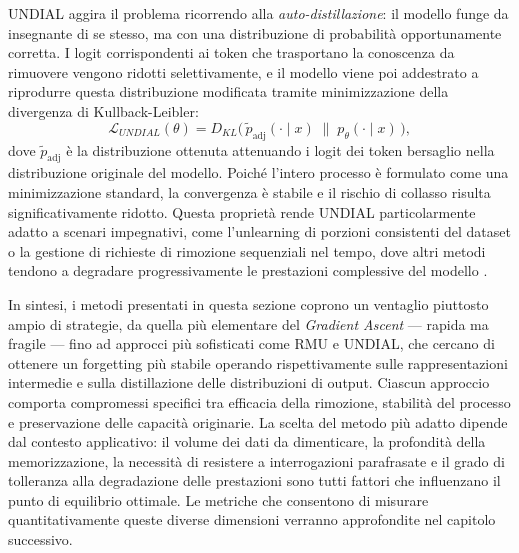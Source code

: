 UNDIAL aggira il problema ricorrendo alla \emph{auto-distillazione}: il modello funge da insegnante di se stesso, ma con una distribuzione di probabilità opportunamente corretta. I logit corrispondenti ai token che trasportano la conoscenza da rimuovere vengono ridotti selettivamente, e il modello viene poi addestrato a riprodurre questa distribuzione modificata tramite minimizzazione della divergenza di Kullback-Leibler:
\begin{equation}
    \mathcal{L}_{UNDIAL}(\theta) = D_{KL}\!\bigl(\,\tilde{p}_{\mathrm{adj}}(\cdot \mid x) \;\|\; p_\theta(\cdot \mid x)\,\bigr),
    \label{eq:undial}
\end{equation}
dove $\tilde{p}_{\mathrm{adj}}$ è la distribuzione ottenuta attenuando i logit dei token bersaglio nella distribuzione originale del modello. Poiché l'intero processo è formulato come una minimizzazione standard, la convergenza è stabile e il rischio di collasso risulta significativamente ridotto. Questa proprietà rende UNDIAL particolarmente adatto a scenari impegnativi, come l'unlearning di porzioni consistenti del dataset o la gestione di richieste di rimozione sequenziali nel tempo, dove altri metodi tendono a degradare progressivamente le prestazioni complessive del modello \cite{dong_undial_2024}.

\medskip

In sintesi, i metodi presentati in questa sezione coprono un ventaglio piuttosto ampio di strategie, da quella più elementare del \emph{Gradient Ascent} — rapida ma fragile — fino ad approcci più sofisticati come RMU e UNDIAL, che cercano di ottenere un forgetting più stabile operando rispettivamente sulle rappresentazioni intermedie e sulla distillazione delle distribuzioni di output. Ciascun approccio comporta compromessi specifici tra efficacia della rimozione, stabilità del processo e preservazione delle capacità originarie. La scelta del metodo più adatto dipende dal contesto applicativo: il volume dei dati da dimenticare, la profondità della memorizzazione, la necessità di resistere a interrogazioni parafrasate e il grado di tolleranza alla degradazione delle prestazioni sono tutti fattori che influenzano il punto di equilibrio ottimale. Le metriche che consentono di misurare quantitativamente queste diverse dimensioni verranno approfondite nel capitolo successivo.
